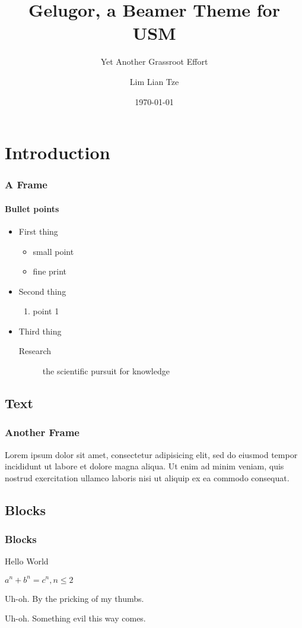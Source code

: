 \documentclass{beamer}
\title{Gelugor, a Beamer Theme for USM}
\subtitle{Yet Another Grassroot Effort}
\author{Lim Lian Tze}
\date{\today}
\institute{\url{liantze@gmail.com}\\\url{http://liantze.penguinattack.org/}}
\begin{document}
\begin{frame}[plain,t]
\titlepage
\end{frame}


\section{Introduction}
\begin{frame}
\frametitle{A Frame}
\framesubtitle{Bullet points}
\begin{itemize}
\item First thing
	\begin{itemize}
	\item small point
	\item fine print
	\end{itemize}
\item Second thing
	\begin{enumerate}
	\item point 1
	\end{enumerate}
\item Third thing
	\begin{description}
	\item[Research] the scientific pursuit for knowledge
	\end{description}
\end{itemize}
\end{frame}

\subsection{Text}
\begin{frame}
\frametitle{Another Frame}
Lorem ipsum dolor sit amet, consectetur adipisicing elit, sed do eiusmod tempor incididunt ut labore et dolore magna aliqua. Ut enim ad minim veniam, quis nostrud exercitation ullamco laboris nisi ut aliquip ex ea commodo consequat.
\end{frame}

\subsection{Blocks}
\begin{frame}
\frametitle{Blocks}
\begin{definition}[Greetings]
Hello World
\end{definition}

\begin{theorem}
$a^n + b^n = c^n, n \leq 2$
\end{theorem}

\begin{alertblock}{Uh-oh.}
By the pricking of my thumbs.
\end{alertblock}

\begin{exampleblock}{Uh-oh.}
Something evil this way comes.
\end{exampleblock}

\end{frame}

\ThankYouFrame
\end{document}
